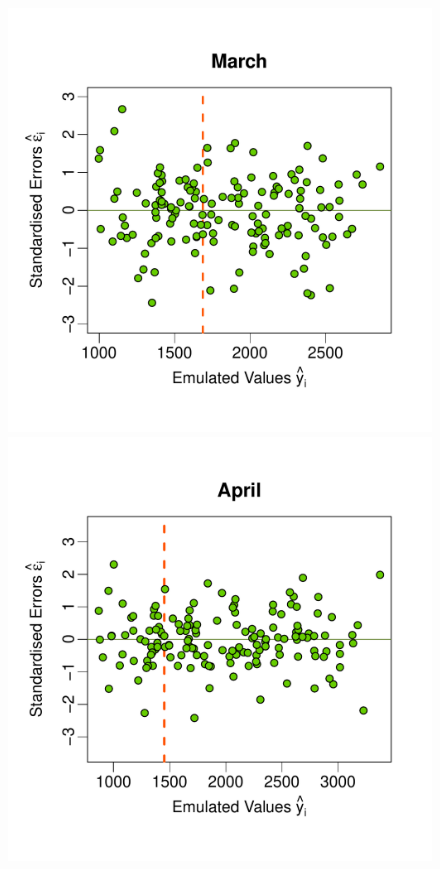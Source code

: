 \documentclass[a4paper, 12pt]{article}
\begin{document}
\begin{figure}
 \includegraphics[width=\scale]{Validation_Plots/Validation_Scatter_03_Mar}\\[-3ex]
 \includegraphics[width=\scale]{Validation_Plots/Validation_Scatter_04_Apr}\hspace{-1ex}

\end{figure}
\end{document}

